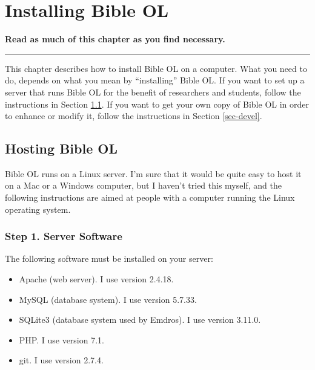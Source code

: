 \documentclass[11pt,oneside,a4paper]{memoir}
\begin{document}
\chapter{Installing Bible OL}\label{chap-install}

\textbf{Read as much of this chapter as you find necessary.}
\plainbreak{3}

This chapter describes how to install Bible OL on a computer. What you need to do, depends on what
you mean by ``installing'' Bible OL. If you want to set up a server that runs Bible OL for the
benefit of researchers and students, follow the instructions in Section \ref{sec-host}.
If you want to get your own copy of Bible OL in order to enhance or modify it, follow the
instructions in Section \ref{sec-devel}.


\section{Hosting Bible OL}\label{sec-host}

Bible OL runs on a Linux server. I'm sure that it would be quite easy to host it on a
Mac or a Windows computer, but I haven't tried this myself, and the
following instructions are aimed at people with a computer running the Linux operating system.

\subsection{Step 1. Server Software}

The following software must be installed on your server:

\begin{itemize}
\item Apache (web server). I use version 2.4.18.
\item MySQL (database system). I use version 5.7.33.
\item SQLite3 (database system used by Emdros). I use version 3.11.0.
\item PHP. I use version 7.1.
\item git. I use version 2.7.4.
\end{itemize}
\end{document}
